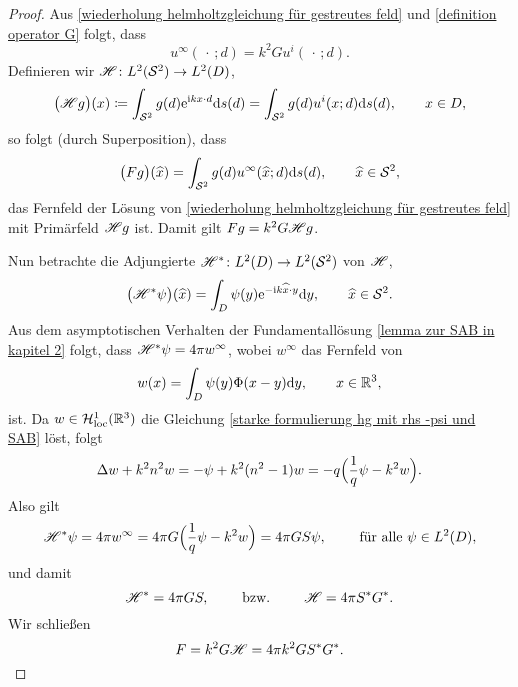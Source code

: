 \begin{proof}
	Aus \eqref{wiederholung helmholtzgleichung für gestreutes feld} und \eqref{definition operator G} folgt, dass
	\begin{equation*}
		u^\infty(\,\cdot\,;d)=k^2Gu^i(\,\cdot\,;d).
	\end{equation*}
	Definieren wir \(\mathscr{H}\colon L^2(\mathcal{S}^2) \to L^2(D)\),
	\begin{equation}
		\label{definition operator curly H}
		\big(\mathscr{H} g\big)(x)\coloneqq\int_{\mathcal{S}^2}g(d)\mathrm{e}^{\mathrm{i} kx\cdot d}\mathrm{d}s(d)=\int_{\mathcal{S}^2}g(d)u^i(x;d)\mathrm{d}s(d),\qquad x\in D,
	\end{equation}
	so folgt (durch Superposition), dass
	\begin{equation*}
		\big(Fg\big)(\widehat{x})=\int_{\mathcal{S}^2}g(d)u^\infty(\widehat{x};d)\mathrm{d}s(d),\qquad\widehat{x}\in\mathcal{S}^2,
	\end{equation*}
	das Fernfeld der Lösung von \eqref{wiederholung helmholtzgleichung für gestreutes feld} mit Primärfeld \(\mathscr{H} g\) ist. Damit gilt \(Fg=k^2G\mathscr{H} g\).\vspace{1mm}
	
	Nun betrachte die Adjungierte \(\mathscr{H}^\ast\colon L^2(D) \to L^2(\mathcal{S}^2)\) von \(\mathscr{H}\),
	\begin{equation*}
		\big(\mathscr{H}^\ast\psi\big)(\widehat{x})=\int_D\psi(y)\mathrm{e}^{-\mathrm{i} k\widehat{x}\cdot y}\mathrm{d}y,\qquad \widehat{x}\in\mathcal{S}^2.
	\end{equation*}
	Aus dem asymptotischen Verhalten der Fundamentallösung \eqref{lemma zur SAB in kapitel 2} folgt, dass \(\mathscr{H}^\ast\psi=4\pi w^\infty\), wobei \(w^\infty\) das Fernfeld von
	\begin{equation*}
		w(x)=\int_D\psi(y)\Phi(x-y)\mathrm{d}y,\qquad x\in\mathbb{R}^3,
	\end{equation*}
	ist. Da \(w\in\mathcal{H}_{\mathrm{loc}}^1(\mathbb{R}^3)\) die Gleichung \eqref{starke formulierung hg mit rhs -psi und SAB} löst, folgt
	\begin{equation*}
		\Delta w+k^2n^2w=-\psi+k^2(n^2-1)w=-q\Big(\frac{1}{q}\psi-k^2w\Big).
	\end{equation*}
	Also gilt
	\begin{equation*}
		\mathscr{H}^\ast\psi=4\pi w^\infty=4\pi G\Big(\frac{1}{q}\psi-k^2w\Big)=4\pi GS\psi,\qquad\text{ für alle }\psi\in L^2(D),
	\end{equation*}
	und damit
	\begin{equation*}
		\mathscr{H}^\ast=4\pi GS,\qquad\text{ bzw. }\qquad\mathscr{H}=4\pi S^\ast G^\ast.
	\end{equation*}
	Wir schließen
	\begin{equation*}
		F=k^2G\mathscr{H}=4\pi k^2GS^\ast G^\ast.
	\end{equation*}
\end{proof}

